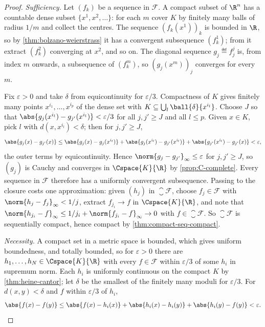 \begin{proof}
	\emph{Sufficiency.} Let $(f_k)$ be a sequence in $\mathcal{F}$. A compact subset
	of $\R^n$ has a countable dense subset $\{x^1,x^2,\dots\}$: for each $m$ cover
	$K$ by finitely many balls of radius $1/m$ and collect the centres. The
	sequence $(f_k(x^1))_k$ is bounded in $\R$, so by
	\autoref{thm:bolzano-weierstrass} it has a convergent subsequence
	$(f_{k}^{1})$; from it extract $(f_{k}^{2})$ converging at $x^2$, and so on.
	The diagonal sequence $g_j\eqdef f_{j}^{j}$ is, from index $m$ onwards, a
	subsequence of $(f_k^m)$, so $(g_j(x^m))_j$ converges for every $m$.

	Fix $\varepsilon>0$ and take $\delta$ from equicontinuity for $\varepsilon/3$.
	Compactness of $K$ gives finitely many points $x^{i_1},\dots,x^{i_p}$ of the
	dense set with $K\subseteq\bigcup_{l}\ball{\delta}{x^{i_l}}$. Choose $J$ so that
	$\abs{g_j(x^{i_l})-g_{j'}(x^{i_l})}<\varepsilon/3$ for all $j,j'\geq J$ and all
	$l\leq p$. Given $x\in K$, pick $l$ with $d(x,x^{i_l})<\delta$; then for
	$j,j'\geq J$,
	\[
		\abs{g_j(x)-g_{j'}(x)}
		\leq\abs{g_j(x)-g_j(x^{i_l})}+\abs{g_j(x^{i_l})-g_{j'}(x^{i_l})}
		+\abs{g_{j'}(x^{i_l})-g_{j'}(x)}<\varepsilon,
	\]
	the outer terms by equicontinuity. Hence $\norm{g_j-g_{j'}}_\infty\leq
		\varepsilon$ for $j,j'\geq J$, so $(g_j)$ is Cauchy and converges in
	$\Cspace{K}{\R}$ by \autoref{prop:C-complete}. Every sequence in $\mathcal{F}$
	therefore has a uniformly convergent subsequence. Passing to the closure
	costs one approximation: given $(h_j)$ in $\closure{\mathcal{F}}$, choose
	$f_j\in\mathcal{F}$ with $\norm{h_j-f_j}_\infty<1/j$, extract
	$f_{j_i}\to f$ in $\Cspace{K}{\R}$, and note that
	$\norm{h_{j_i}-f}_\infty\leq 1/j_i+\norm{f_{j_i}-f}_\infty\to0$ with
	$f\in\closure{\mathcal{F}}$. So $\closure{\mathcal{F}}$ is sequentially
	compact, hence compact by \autoref{thm:compact-seq-compact}.

	\emph{Necessity.} A compact set in a metric space is bounded, which gives
	uniform boundedness, and totally bounded, so for $\varepsilon>0$ there are
	$h_1,\dots,h_N\in\Cspace{K}{\R}$ with every $f\in\mathcal{F}$ within
	$\varepsilon/3$ of some $h_i$ in supremum norm. Each $h_i$ is uniformly
	continuous on the compact $K$ by \autoref{thm:heine-cantor}; let $\delta$
	be the smallest of the finitely many moduli for $\varepsilon/3$. For
	$d(x,y)<\delta$ and $f$ within $\varepsilon/3$ of $h_i$,
	\[
		\abs{f(x)-f(y)}\leq\abs{f(x)-h_i(x)}+\abs{h_i(x)-h_i(y)}
		+\abs{h_i(y)-f(y)}<\varepsilon. \qedhere
	\]
\end{proof}


